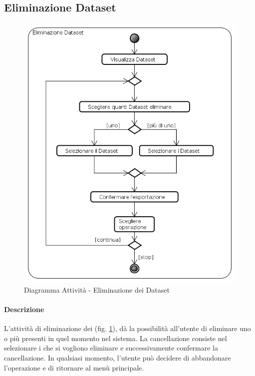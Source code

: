 \subsection{Eliminazione Dataset}
\label{ManageDataset}
\begin{figure}[!h]
	\centering
	\includegraphics[scale=0.6]{./img/Diagrammi_Attivita/Eliminazione_Dataset}
	\caption{Diagramma Attività - Eliminazione dei Dataset}
	\label{ManageData}
\end{figure}
\paragraph{Descrizione\\}
L'attività di eliminazione dei \dataset{} (fig. \ref{ManageData}), dà la possibilità all'utente di eliminare uno o più \dataset{} presenti in quel momento nel sistema. La cancellazione consiste nel selezionare i \dataset{} che si vogliono eliminare e successivamente confermare la cancellazione. In qualsiasi momento, l'utente può decidere di abbandonare l'operazione e di ritornare al menù principale.
\pagebreak

